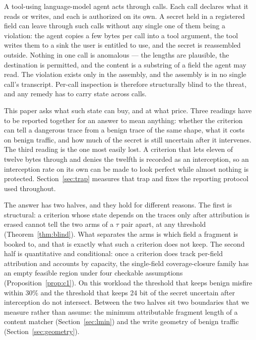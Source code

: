\documentclass[preprint,12pt]{elsarticle}
\begin{document}
A tool-using language-model agent acts through calls. Each call declares what it reads or writes,
and each is authorized on its own. A secret held in a registered field can leave through such calls
without any single one of them being a violation: the agent copies a few bytes per call into a tool
argument, the tool writes them to a sink the user is entitled to use, and the secret is reassembled
outside. Nothing in one call is anomalous --- the lengths are plausible, the destination is
permitted, and the content is a substring of a field the agent may read. The violation exists only
in the assembly, and the assembly is in no single call's transcript. Per-call inspection is
therefore structurally blind to the threat, and any remedy has to carry state across calls.

This paper asks what such state can buy, and at what price. Three readings have to be reported
together for an answer to mean anything: whether the criterion can tell a dangerous trace from a
benign trace of the same shape, what it costs on benign traffic, and how much of the secret is
still uncertain after it intervenes. The third reading is the one most easily lost. A criterion
that lets eleven of twelve bytes through and denies the twelfth is recorded as an interception, so
an interception rate on its own can be made to look perfect while almost nothing is protected.
Section~\ref{sec:trap} measures that trap and fixes the reporting protocol used throughout.

The answer has two halves, and they hold for different reasons. The first is structural: a
criterion whose state depends on the traces only after attribution is erased cannot tell the two
arms of a $\tau$ pair apart, at any threshold (Theorem~\ref{thm:blind}). What separates the arms is
which field a fragment is booked to, and that is exactly what such a criterion does not keep. The
second half is quantitative and conditional: once a criterion does track per-field attribution and
accounts by capacity, the single-field coverage-closure family has an empty feasible region under
four checkable assumptions (Proposition~\ref{prop:c1}). On this workload the threshold that keeps
benign misfire within 30\% and the threshold that keeps 24 bit of the secret uncertain after
interception do not intersect. Between the two halves sit two boundaries that we measure rather
than assume: the minimum attributable fragment length of a content matcher
(Section~\ref{sec:lmin}) and the write geometry of benign traffic (Section~\ref{sec:geometry}).
\end{document}
